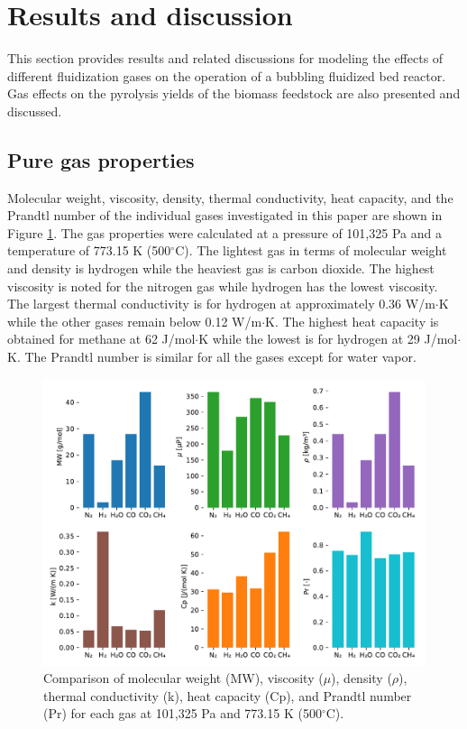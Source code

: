 \documentclass{article}
\begin{document}
\section{Results and discussion}

This section provides results and related discussions for modeling the effects of different fluidization gases on the operation of a bubbling fluidized bed reactor. Gas effects on the pyrolysis yields of the biomass feedstock are also presented and discussed.

\subsection{Pure gas properties}

Molecular weight, viscosity, density, thermal conductivity, heat capacity, and the Prandtl number of the individual gases investigated in this paper are shown in Figure \ref{fig:gas-properties}. The gas properties were calculated at a pressure of 101,325 Pa and a temperature of 773.15 K (500$^\circ$C). The lightest gas in terms of molecular weight and density is hydrogen while the heaviest gas is carbon dioxide. The highest viscosity is noted for the nitrogen gas while hydrogen has the lowest viscosity. The largest thermal conductivity is for hydrogen at approximately 0.36 W/m$\cdot$K while the other gases remain below 0.12 W/m$\cdot$K. The highest heat capacity is obtained for methane at 62 J/mol$\cdot$K while the lowest is for hydrogen at 29 J/mol$\cdot$K. The Prandtl number is similar for all the gases except for water vapor.

\begin{figure}[H]
    \centering
    \includegraphics[width=\textwidth]{gas-properties.pdf}
    \caption{Comparison of molecular weight (MW), viscosity ($\mu$), density ($\rho$), thermal conductivity (k), heat capacity (Cp), and Prandtl number (Pr) for each gas at 101,325 Pa and 773.15 K (500$^\circ$C).}
    \label{fig:gas-properties}
\end{figure}
\end{document}
